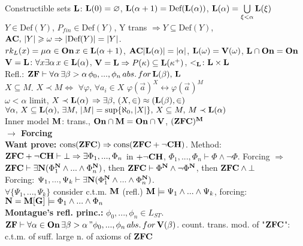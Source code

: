 \documentclass[9pt]{article}
\newcommand{\class}[1]{{\bf #1}}
\newcommand{\mytitle}[1]{ {\bf $\rightarrow$ #1}\\}
\newcommand{\On}{\class{On}}
\newcommand{\V}{\class{V}}
\newcommand{\Ll}{\class{L}}
\newcommand{\Def}{\mbox{Def}}
\begin{document}
\begin{multicols*}{2}
Constructible sets $\class{L}$: $\Ll(0)=\varnothing$, $\Ll(\alpha+1)=\Def(\Ll(\alpha))$, $\Ll(\alpha)=\bigcup\limits_{\xi<\alpha}\Ll(\xi)$\\
$Y\in\Def(Y)$, $P_{fin}\in\Def(Y)$, Y trans $\Rightarrow Y\subseteq \Def(Y)$, $\class{AC},\,|Y|\geqslant\omega\Rightarrow|\Def(Y)|=|Y|$.\\
$rk_L(x)=\mu\alpha\in\On\,x\in \Ll(\alpha+1)$, $\class{AC} |\Ll(\alpha)|=|\alpha|$, $\Ll(\omega)=\V(\omega)$, $\Ll\cap\On=\On$\\
$\V=\class{L}\colon \forall x\exists \alpha\,x\in\class{L}(\alpha)$, $\V=\Ll\Rightarrow P(\kappa)\subseteq\Ll(\kappa^+)$, $<_\Ll\colon \Ll\times\Ll$\\
Refl.: $\class{ZF}\vdash \forall\alpha\,\exists\beta>\alpha\,\phi_0,...,\phi_n\,abs.\,for\, \class{L}(\beta),\,\class{L}$\\
$X\subseteq M$. $X\prec M\Leftrightarrow$ $\forall \varphi,\,\forall a_i\in X$ $\varphi(\vec{a})^X\leftrightarrow\varphi(\vec{a})^M$\\
$\omega<\alpha$ limit, $X\prec\Ll(\alpha)$ $\Rightarrow\exists \beta,\,(X,\in)\approx(\Ll(\beta),\in)$\\
$\forall\alpha,\,X\subseteq \Ll(\alpha),\,\exists M,\,|M|=\sup\{\aleph_0,|X|\},\,X\subseteq M,\,M\prec\Ll(\alpha)$\\
Inner model $\class{M}$: trans., $\class{On}\cap\class{M}=\class{On}\cap\V$, $(\class{ZFC})^\class{M}$\\
\mytitle{Forcing}
{\bf Want prove:} $\mbox{cons}(\class{ZFC})\Rightarrow \mbox{cons}(\class{ZFC}+\neg \class{CH})$.
Method: $\class{ZFC}+\neg \class{CH}\vdash\bot\Rightarrow\exists \Phi_1,...,\Phi_n$ in $+\neg \class{CH}$, $\Phi_1,...,\Phi_n\vdash \Phi \wedge\neg\Phi$.
Forcing $\Rightarrow$ $\class{ZFC}\vdash\exists\class{N}(\Phi_1^\class{N}\wedge...\wedge\Phi_n^\class{N})$, then $\class{ZFC}\vdash \Phi^\class{N}\wedge\neg\Phi^\class{N}$, then $\class{ZFC}\wedge\bot$\\
Forcing: $\Psi_1,...,\Psi_k\vdash \exists\class{N}(\Phi_1^\class{N}\wedge...\wedge\Phi_n^\class{N})$.\\
$\forall \{\Psi_1,...,\Psi_k\}$ consider c.t.m. $\class{M}$ (refl.) $\class{M}\models \Psi_1\wedge...\wedge\Psi_k$, forcing: $\class{N}=\class{M}[\class{G}]\models\Phi_1\wedge...\wedge\Phi_n$\\
{\bf Montague's refl. princ.:} $\phi_0,...,\phi_n\in L_{ST}$. $\class{ZF}\vdash \forall\alpha\in\On\,\exists\beta>\alpha \,"\phi_0,...,\phi_n\,abs.\,for\,\V(\beta)$. count. trans. mod. of "$\class{ZFC}$": c.t.m. of suff. large n. of axioms of $\class{ZFC}$\\

\end{multicols*}
\end{document}
